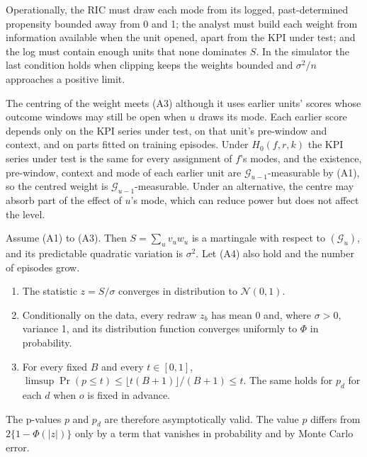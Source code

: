 Operationally, the RIC must draw each mode from its logged, past-determined propensity bounded away from 0 and 1; the
analyst must build each weight from information available when the unit opened, apart from the KPI under test; and the
log must contain enough units that none dominates $S$. In the simulator the last condition holds when clipping keeps
the weights bounded and $\sigma^2/n$ approaches a positive limit.

The centring of the weight meets (A3) although it uses earlier units' scores whose outcome windows may still be open
when $u$ draws its mode. Each earlier score depends only on the KPI series under test, on that unit's pre-window and
context, and on parts fitted on training episodes. Under $H_0(f, r, k)$ the KPI series under test is the same for every
assignment of $f$'s modes, and the existence, pre-window, context and mode of each earlier unit are
$\mathcal{G}_{u-1}$-measurable by (A1), so the centred weight is $\mathcal{G}_{u-1}$-measurable. Under an alternative,
the centre may absorb part of the effect of $u$'s mode, which can reduce power but does not affect the level.

\begin{proposition}
\label{prop:pmrt}
Assume (A1) to (A3). Then $S = \sum_u v_u w_u$ is a martingale with respect to $(\mathcal{G}_u)$, and its predictable
quadratic variation is $\sigma^2$. Let (A4) also hold and the number of episodes grow.
\begin{enumerate}
\item The statistic $z = S / \sigma$ converges in distribution to $\mathcal{N}(0, 1)$.
\item Conditionally on the data, every redraw $z_b$ has mean 0 and, where $\sigma > 0$, variance 1, and its distribution
  function converges uniformly to $\Phi$ in probability.
\item For every fixed $B$ and every $t \in [0, 1]$, $\limsup \Pr(p \le t) \le \lfloor t(B + 1) \rfloor / (B + 1) \le t$.
  The same holds for $p_d$ for each $d$ when $o$ is fixed in advance.
\end{enumerate}
The p-values $p$ and $p_d$ are therefore asymptotically valid. The value $p$ differs from
$2\{1 - \Phi(|z|)\}$ only by a term that vanishes in probability and by Monte Carlo error.
\end{proposition}

